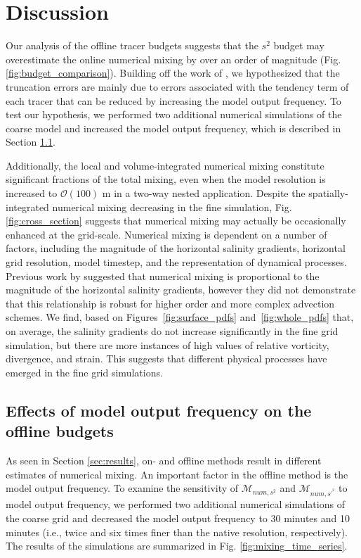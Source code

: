 \documentclass[draft]{agujournal2019}
\begin{document}
\section{Discussion} \label{sec:discussion}

Our analysis of the offline tracer budgets suggests that the $s^2$ budget may overestimate the online numerical mixing by over an order of magnitude (Fig. \ref{fig:budget_comparison}). Building off the work of , we hypothesized that the truncation errors are mainly due to errors associated with the tendency term of each tracer that can be reduced by increasing the model output frequency. To test our hypothesis, we performed two additional numerical simulations of the coarse model and increased the model output frequency, which is described in Section \ref{sec:model_output_frequency}.

Additionally, the local and volume-integrated numerical mixing constitute significant fractions of the total mixing, even when the model resolution is increased to $\mathcal{O}(100)$ m in a two-way nested application. Despite the spatially-integrated numerical mixing decreasing in the fine simulation, Fig. \ref{fig:cross_section} suggests that numerical mixing may actually be occasionally enhanced at the grid-scale. Numerical mixing is dependent on a number of factors, including the magnitude of the horizontal salinity gradients, horizontal grid resolution, model timestep, and the representation of dynamical processes. Previous work by  suggested that numerical mixing is proportional to the magnitude of the horizontal salinity gradients, however they did not demonstrate that this relationship is robust for higher order and more complex advection schemes. We find, based on Figures~\ref{fig:surface_pdfs} and~\ref{fig:whole_pdfs} that, on average, the salinity gradients do not increase significantly in the fine grid simulation, but there are more instances of high values of relative vorticity, divergence, and strain. This suggests that different physical processes have emerged in the fine grid simulations.

\subsection{Effects of model output frequency on the offline budgets} \label{sec:model_output_frequency}

As seen in Section \ref{sec:results}, on- and offline methods result in different estimates of numerical mixing. An important factor in the offline method is the model output frequency. To examine the sensitivity of $\mathcal{M}_{num, s^2}$ and $\mathcal{M}_{num, s^{\prime^2}}$ to model output frequency, we performed two additional numerical simulations of the coarse grid and decreased the model output frequency to 30 minutes and 10 minutes (i.e., twice and six times finer than the native resolution, respectively). The results of the simulations are summarized in Fig. \ref{fig:mixing_time_series}.
\end{document}
